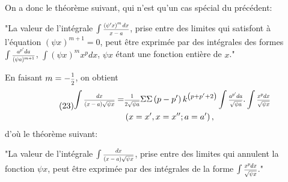 \documentclass[oneside, 12 pt, leqno]{memoir}
\let\oldfrac\frac
\def\frac#1#2{\mathchoice{\text{\scalebox{.83}{${\oldfrac{#1}{#2}}$}}}{\text{\scalebox{.83}{${\displaystyle\oldfrac{#1}{#2}}$}}}{\genfrac{}{}{}{2}{#1}{#2}}{\genfrac{}{}{}{3}{#1}{#2}}}
\begin{document}
On a donc le théorème suivant, qui n'est qu'un cas spécial du précédent:

"La valeur de l'intégrale \(\int \frac{\left(\psi^{\prime} x\right)^m d x}{x-a}\), prise entre des limites qui satisfont à l'équation \((\psi x)^{m+1}=0\), peut être exprimée par des intégrales des formes \(\int \frac{a^{p^{\prime}} d a}{(\psi a)^{m+1}}\), \(\int(\psi x)^m x^p d x\), \(\psi x\) étant une fonction entière de \(x\)."

En faisant \(m=-\frac{1}{2}\), on obtient
\[\tag{23}\begin{aligned}
\int \frac{d x}{(x-a) \sqrt{\psi x}}= & \frac{1}{2 \sqrt{\psi a}} \Sigma \Sigma\left(p-p^{\prime}\right) k^{\left(p+p^{\prime}+2\right)} \int \frac{a^{p^{\prime}} d a}{\sqrt{\psi a}}. \int \frac{x^p d x}{\sqrt{\psi x}} \\
& \left(x=x^{\prime}, x=x^{\prime \prime} ; a=a^{\prime}\right),
\end{aligned}
\]
d'où le théorème suivant:

"La valeur de l'intégrale \(\int \frac{dx}{(x - a) \sqrt{\psi x}}\), prise entre des limites qui annulent la fonction \(\psi x\), peut être exprimée par des intégrales de la forme \(\int \frac{x^p d x}{\sqrt{\psi x}}\)."
\end{document}
